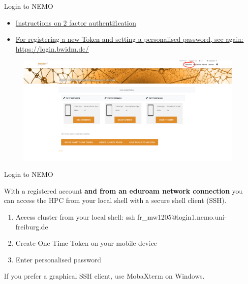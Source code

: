 \documentclass{beamer}
\begin{document}
\begin{frame}{Login to NEMO}

\begin{itemize}

\item \href{https://wiki.bwhpc.de/e/Registration/2FA}{Instructions on 2 factor authentification} 

\item \href{https://login.bwidm.de/}{For registering a new Token and setting a personalised password, see again: https://login.bwidm.de/}

\end{itemize}

\begin{figure}
    \centering
    \includegraphics[width=0.95\linewidth]{figures/BWIDM.png}
\end{figure}

\end{frame}

\begin{frame}{Login to NEMO}

With a registered account \textbf{and from an eduroam network connection} you can access the HPC from your local shell with a secure shell client (SSH).

\begin{enumerate}
    \item Access cluster from your local shell: ssh fr\_mw1205@login1.nemo.uni-freiburg.de
    \item Create One Time Token on your mobile device
    \item Enter personalised password
\end{enumerate}
\vspace{0.6cm}
\scalebox{0.6}{

}
\vspace{0.4cm}

If you prefer a graphical SSH client, use MobaXterm on Windows.

\end{frame}
\end{document}
